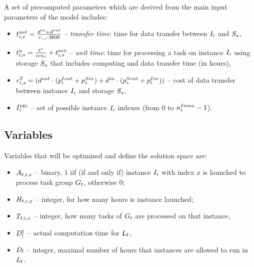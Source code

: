 {    A set of precomputed parameters which are derived from the main input parameters of the model includes:
    \begin{itemize}
        \item $t^{net}_{i,s} = \frac{d^{in}+d^{out}}{r_{i,s} \cdot 3600}$ -- {\em transfer time}: time for data transfer between
        $I_i$ and $S_s$,
        \item $\label{unitTime}\unitTime_{i,s} = \frac{\execTime}{\ccu_i} + \transferTime_{i,s}$ -- {\em unit time}: time for processing a task
        on instance $I_i$ using storage $S_s$ that includes computing and
        data transfer time (in hours),
        \item $c^T_{i,s} = (d^{out} \cdot
             (p^{Iout}_i + p^{Sin}_s) +
             d^{in} \cdot (p^{Sout}_s+p^{Iin}_i)) $ -- cost of data transfer between instance
        $I_i$ and storage $S_s$,
        \item $I^{idx}_i$ -- set of possible instance $I_i$ indexes (from $0$ to $n^{Imax}_i - 1$).
    \end{itemize}
   
    \subsection{Variables}
    \label{sec:workflow:problem:variables}
    Variables that will be optimized and define the solution space are:
    \begin{itemize}
        \item $A_{t,i,x}$ -- binary, $1$ iif (if and only if) instance $I_i$ with index $x$ is launched to process task group $G_t$, otherwise $0$;
        \item $H_{t,i,x}$ -- integer, for how many hours is instance launched;
        \item $T_{t,i,x}$ -- integer, how many tasks of $G_t$ are processed on that instance,
        \item $D^t_l$ -- actual computation time for $L_l$,
        \item $D_l$ -- integer, maximal number of hours that instances are allowed to run in $L_l$.
    \end{itemize}
    
}
